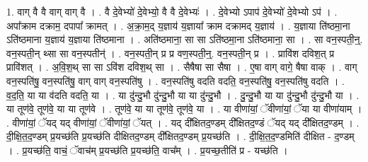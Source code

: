 \documentclass[17pt]{extarticle}
\begin{document}
1. वाग् वै वै वाग् वाग् वै । . वै दे॒वेभ्यो॑ दे॒वेभ्यो॒ वै वै दे॒वेभ्यः॑ । . दे॒वेभ्यो ऽपाप॑ दे॒वेभ्यो॑ दे॒वेभ्यो ऽप॑ । . अपा᳚क्राम दक्राम॒ दपापा᳚ क्रामत् । . अ॒क्रा॒म॒द् य॒ज्ञाय॑ य॒ज्ञाया᳚ क्राम दक्रामद् य॒ज्ञाय॑ । . य॒ज्ञाया ति॑ष्ठमा॒ना ऽति॑ष्ठमाना य॒ज्ञाय॑ य॒ज्ञाया ति॑ष्ठमाना । . अति॑ष्ठमाना॒ सा सा ऽति॑ष्ठमा॒ना ऽति॑ष्ठमाना॒ सा । . सा वन॒स्पती॒न्॒. वन॒स्पती॒न् थ्सा सा वन॒स्पतीन्॑ । . वन॒स्पती॒न् प्र प्र वण॒स्पती॒न्॒. वन॒स्पती॒न् प्र । . प्रावि॑श दविश॒त् प्र प्रावि॑शत् । . अ॒वि॒श॒थ् सा सा ऽवि॑श दविश॒थ् सा । . सैषैषा सा सैषा । . ए॒षा वाग् वागे॒ षैषा वाक् । . वाग् वन॒स्पति॑षु॒ वन॒स्पति॑षु॒ वाग् वाग् वन॒स्पति॑षु । . वन॒स्पति॑षु वदति वदति॒ वन॒स्पति॑षु॒ वन॒स्पति॑षु वदति । . व॒द॒ति॒ या या व॑दति वदति॒ या । . या दु॑न्दु॒भौ दु॑न्दु॒भौ या या दु॑न्दु॒भौ । . दु॒न्दु॒भौ या या दु॑न्दु॒भौ दु॑न्दु॒भौ या । . या तूण॑वे॒ तूण॑वे॒ या या तूण॑वे । . तूण॑वे॒ या या तूण॑वे॒ तूण॑वे॒ या । . या वीणा॑यां॒ ॅवीणा॑यां॒ ॅया या वीणा॑याम् । . वीणा॑यां॒ ॅयद् यद् वीणा॑यां॒ ॅवीणा॑यां॒ ॅयत् । . यद् दी᳚क्षितद॒ण्डम् दी᳚क्षितद॒ण्डं ॅयद् यद् दी᳚क्षितद॒ण्डम् । . दी॒क्षि॒त॒द॒ण्डम् प्र॒यच्छ॑ति प्र॒यच्छ॑ति दीक्षितद॒ण्डम् दी᳚क्षितद॒ण्डम् प्र॒यच्छ॑ति । . दी॒क्षि॒त॒द॒ण्डमिति॑ दीक्षित - द॒ण्डम् । . प्र॒यच्छ॑ति॒ वाचं॒ ॅवाच॑म् प्र॒यच्छ॑ति प्र॒यच्छ॑ति॒ वाच᳚म् । . प्र॒यच्छ॒तीति॑ प्र - यच्छ॑ति । \newline
\end{document}
